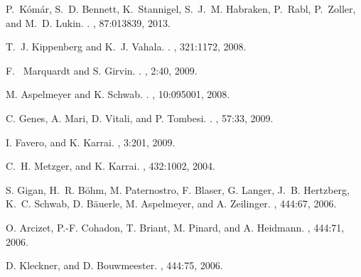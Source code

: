 
{ 
\ssp %
  

}

 
\ssp %
\begin{thebibliography}{1}


P.~K\'{o}m\'{a}r, 
S.~D. Bennett, 
K.~Stannigel, 
S.~J.~M. Habraken, 
P.~Rabl,
P.~Zoller, 
and M.~D. Lukin.
.
,
87:013839, 2013.

%
T.~J. Kippenberg
and K.~J. Vahala.
.
,
321:1172, 2008.

%
F.~ Marquardt
and S. Girvin.
.
,
2:40, 2009.

%
M. Aspelmeyer
and K. Schwab.
.
,
10:095001, 2008.

%
C. Genes,
A. Mari,
D. Vitali,
and P. Tombesi.
.
,
57:33, 2009.

I. Favero,
and K. Karrai.
,
3:201, 2009.

C.~H. Metzger,
and K. Karrai.
,
432:1002, 2004.

S. Gigan,
H.~R. B\"{o}hm,
M. Paternostro,
F. Blaser,
G. Langer,
J.~B. Hertzberg,
K.~C. Schwab,
D. B\"{a}uerle,
M. Aspelmeyer,
and A. Zeilinger.
,
444:67, 2006.

O. Arcizet,
P.-F. Cohadon,
T. Briant,
M. Pinard,
and A. Heidmann.
,
444:71, 2006.

D. Kleckner,
and D. Bouwmeester.
,
444:75, 2006.


\end{thebibliography}

